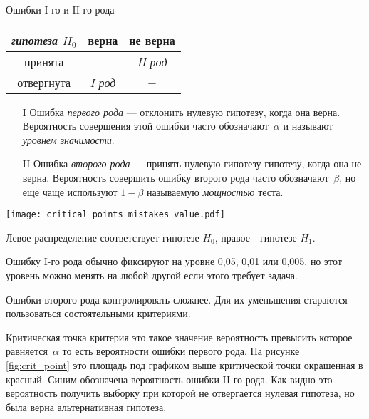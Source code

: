 \documentclass[../handbook.tex]{subfiles}
\begin{document}
\begin{margintable}
    \caption{Ошибки I-го и II-го рода}
    \label{tab:mistakes}
    \begin{center}
        \begin{tabular}[c]{c|c c}
            {\it гипотеза $H_0$} & верна & не верна \\
            \hline
            принята & + & {\it II род} \\
            отвергнута & {\it I род} & + \\
        \end{tabular}
    \end{center}
\end{margintable}
\begin{itemize}
        
    \item[I] Ошибка \emph{первого рода} --- отклонить нулевую гипотезу, когда
        она верна. Вероятность совершения этой ошибки часто обозначают~$\alpha$
        и называют \emph{уровнем значимости}.

    \item[II] Ошибка \emph{второго рода} --- принять нулевую гипотезу 
        гипотезу, когда она не верна. Вероятность совершить ошибку второго рода
        часто обозначают~$\beta$, но еще чаще используют $1 - \beta$
        называемую \emph{мощностью} теста.

\end{itemize}

\begin{marginfigure}
    \texttt{[image: critical\_points\_mistakes\_value.pdf]}
    \caption{Левое распределение соответствует гипотезе $H_0$, правое - гипотезе $H_1$.}
    \label{fig:crit_point}
\end{marginfigure}
Ошибку I-го рода обычно фиксируют на уровне 0,05, 0,01 или 0,005, но этот
уровень можно менять на любой другой если этого требует задача.

Ошибки второго рода контролировать сложнее. Для их уменьшения стараются
пользоваться состоятельными критериями.

Критическая точка критерия это такое значение вероятность превысить которое
равняется~$\alpha$ то есть вероятности ошибки первого рода. На рисунке
\ref{fig:crit_point} это площадь под графиком выше критической точки окрашенная
в красный. Синим обозначена вероятность ошибки II-го рода. Как видно это
вероятность получить выборку при которой не отвергается нулевая гипотеза, но
была верна альтернативная гипотеза.
\end{document}
